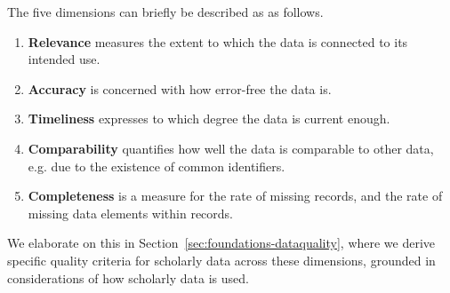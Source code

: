 The five dimensions can briefly be described as as follows.

\begin{enumerate}
    \item \textbf{Relevance} measures the extent to which the data is connected to its intended use.
    \item \textbf{Accuracy} is concerned with how error-free the data is.
    \item \textbf{Timeliness} expresses to which degree the data is current enough.
    \item \textbf{Comparability} quantifies how well the data is comparable to other data, e.g. due to the existence of common identifiers.
    \item \textbf{Completeness} is a measure for the rate of missing records, and the rate of missing data elements within records.
\end{enumerate}

We elaborate on this in Section~\ref{sec:foundations-dataquality}, where we derive specific quality criteria for scholarly data across these dimensions, grounded in considerations of how scholarly data is used.


